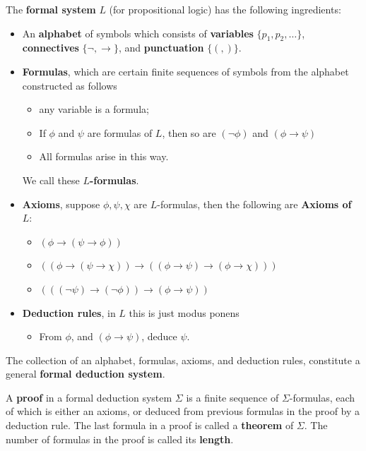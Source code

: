 \documentclass{article}
\begin{document}
\begin{definition}
    The \textbf{formal system} $L$ (for propositional logic) has the following ingredients: \begin{itemize}
        \item An \textbf{alphabet} of symbols which consists of \textbf{variables} $\{p_1,p_2,\ldots\}$, \textbf{connectives} $\{\neg,\rightarrow\}$, and \textbf{punctuation} $\{(, )\}$.
        \item \textbf{Formulas}, which are certain finite sequences of symbols from the alphabet constructed as follows \begin{itemize}
            \item any variable is a formula;
            \item If $\phi$ and $\psi$ are formulas of $L$, then so are $(\neg\phi)$ and $(\phi\rightarrow\psi)$
            \item All formulas arise in this way.
        \end{itemize}
        We call these $L$\textbf{-formulas}.
        \item \textbf{Axioms}, suppose $\phi,\psi,\chi$ are $L$-formulas, then the following are \textbf{Axioms of $L$}: \begin{itemize}
            \item[(A1)] $(\phi\rightarrow(\psi\rightarrow\phi))$
            \item[(A2)] $((\phi\rightarrow(\psi\rightarrow\chi))\rightarrow((\phi\rightarrow\psi)\rightarrow(\phi\rightarrow\chi)))$
            \item[(A3)] $(((\neg\psi)\rightarrow(\neg\phi))\rightarrow(\phi\rightarrow\psi))$
        \end{itemize}
        \item \textbf{Deduction rules}, in $L$ this is just modus ponens\begin{itemize}
            \item[(MP)] From $\phi$, and $(\phi\rightarrow\psi)$, deduce $\psi$. 
        \end{itemize}
    \end{itemize}
\end{definition}

The collection of an alphabet, formulas, axioms, and deduction rules, constitute a general \textbf{formal deduction system}.

\begin{definition}
    A \textbf{proof} in a formal deduction system $\Sigma$ is a finite sequence of $\Sigma$-formulas, each of which is either an axioms, or deduced from previous formulas in the proof by a deduction rule. The last formula in a proof is called a \textbf{theorem} of $\Sigma$. The number of formulas in the proof is called its \textbf{length}.
\end{definition}
\end{document}
